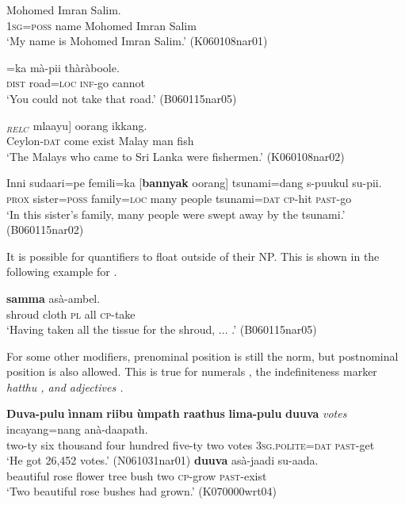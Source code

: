 \ea\label{ex:np:poss}
\gll [\textbf{Se=ppe}     naama] Mohomed Imran Salim. \\ %
     1\textsc{sg}=\textsc{poss} name Mohomed Imran Salim  \\
    `My name is Mohomed Imran Salim.' (K060108nar01)
\z



\ea\label{ex:np:deic}
=ka  mà-pii thàràboole. \\
      \textsc{dist} road=\textsc{loc} \textsc{inf}-go cannot \\
    `You could not take that road.'  (B060115nar05)
\z



\ea\label{ex:np:relc}
\gll [[Seelon=nang dhaathang aada \zero]$_{RELC}$ mlaayu] oorang ikkang. \\ %
 Ceylon-\textsc{dat} come exist { } Malay man fish\\
`The Malays who came to Sri Lanka were fishermen.' (K060108nar02)
\z


 
\ea\label{ex:np:quant}
\gll Inni     sudaari=pe   femili=ka    [\textbf{bannyak} oorang] tsunami=dang     s-puukul su-pii. \\
      \textsc{prox} sister=\textsc{poss} family=\textsc{loc} many people tsunami=\textsc{dat} \textsc{cp}-hit \textsc{past}-go\\
    `In this sister's family, many people were swept away by the tsunami.' (B060115nar02)
\z


It is possible for quantifiers to float outside of their NP. This is shown in the following example for .


\ea\label{ex:np:quant:float}
 \textbf{samma} asà-ambel. \\
     shroud cloth \textsc{pl} all \textsc{cp}-take  \\
    `Having taken all the tissue for the shroud, ... .'  (B060115nar05)
\z


For some other modifiers, prenominal position is still the norm, but postnominal position is also allowed. This is true for numerals , 
the indefiniteness marker \em hatthu \em {}, 
and adjectives .

\ea\label{ex:np:num}
    \ea
	\gll \textbf{Duva-pulu}    \textbf{ìnnam} \textbf{riibu}    \textbf{ùmpath}  \textbf{raathus} \textbf{lima-pulu}    \textbf{duuva} {\em votes}  incayang=nang    anà-daapath. \\ %
	two-ty six thousand four hundred five-ty two votes 3\textsc{sg}.\textsc{polite}=\textsc{dat} \textsc{past}-get\\
	    `He got 26,452 votes.' (N061031nar01)
    \ex
	  \textbf{duuva} asà-jaadi su-aada. \\
	    beautiful rose flower tree bush two \textsc{cp}-grow \textsc{past}-exist \\
	    `Two beautiful rose bushes had grown.'  (K070000wrt04)
    \z
\z

